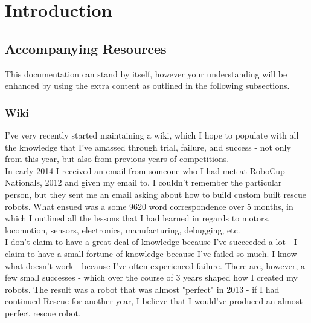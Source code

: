 \chapter*{Introduction}
	\label{chap:introduction}


    \section*{Accompanying Resources}
    	\label{sec:resources}
        This documentation can stand by itself, however your understanding will be enhanced by using the extra content as outlined in the following subsections.

        \subsection*{Wiki}
        	\label{subsec:Wiki}
            I've very recently started maintaining a wiki, which I hope to populate with all the knowledge that I've amassed through trial, failure, and success - not only from this year, but also from previous years of competitions.\\
            
            In early 2014 I received an email from someone who I had met at RoboCup Nationals, 2012 and given my email to. I couldn't remember the particular person, but they sent me an email asking about how to build custom built rescue robots. What ensued was a some 9620 word correspondence over 5 months, in which I outlined all the lessons that I had learned in regards to motors, locomotion, sensors, electronics, manufacturing, debugging, etc.\\
            
            I don't claim to have a great deal of knowledge because I've succeeded a lot - I claim to have a small fortune of knowledge because I've failed so much. I know what doesn't work - because I've often experienced failure. There are, however, a few small successes - which over the course of 3 years shaped how I created my robots. The result was a robot that was almost "perfect" in 2013 - if I had continued Rescue for another year, I believe that I would've produced an almost perfect rescue robot.\\
            
